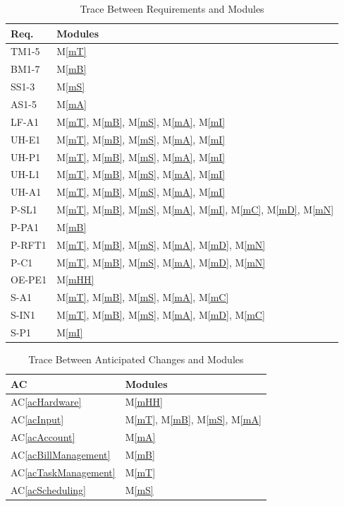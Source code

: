 \documentclass[12pt, titlepage]{article}
\newcommand{\acref}[1]{AC\ref{#1}}
\newcommand{\mref}[1]{M\ref{#1}}
\begin{document}
\begin{table}[H]
\centering
\begin{tabular}{p{} p{}}
\toprule
\textbf{Req.} & \textbf{Modules}\\
\midrule
TM1-5 & \mref{mT}\\
BM1-7 & \mref{mB}\\
SS1-3 & \mref{mS}\\
AS1-5 & \mref{mA}\\
LF-A1 & \mref{mT}, \mref{mB}, \mref{mS}, \mref{mA}, \mref{mI}\\
UH-E1 & \mref{mT}, \mref{mB}, \mref{mS}, \mref{mA}, \mref{mI}\\
UH-P1 & \mref{mT}, \mref{mB}, \mref{mS}, \mref{mA}, \mref{mI}\\
UH-L1 & \mref{mT}, \mref{mB}, \mref{mS}, \mref{mA}, \mref{mI}\\
UH-A1 & \mref{mT}, \mref{mB}, \mref{mS}, \mref{mA}, \mref{mI}\\
P-SL1 & \mref{mT}, \mref{mB}, \mref{mS}, \mref{mA}, \mref{mI}, \mref{mC}, \mref{mD}, \mref{mN}\\
P-PA1 & \mref{mB}\\
P-RFT1 & \mref{mT}, \mref{mB}, \mref{mS}, \mref{mA}, \mref{mD}, \mref{mN}\\
P-C1 & \mref{mT}, \mref{mB}, \mref{mS}, \mref{mA}, \mref{mD}, \mref{mN}\\
OE-PE1 & \mref{mHH}\\
S-A1 & \mref{mT}, \mref{mB}, \mref{mS}, \mref{mA}, \mref{mC}\\
S-IN1 & \mref{mT}, \mref{mB}, \mref{mS}, \mref{mA}, \mref{mD}, \mref{mC}\\
S-P1 & \mref{mI}\\
\bottomrule
\end{tabular}
\caption{Trace Between Requirements and Modules}
\label{TblRT}
\end{table}

\begin{table}[H]
\centering
\begin{tabular}{p{} p{}}
\toprule
\textbf{AC} & \textbf{Modules}\\
\midrule
\acref{acHardware} & \mref{mHH}\\
\acref{acInput} & \mref{mT}, \mref{mB}, \mref{mS}, \mref{mA}\\
\acref{acAccount} & \mref{mA}\\
\acref{acBillManagement} & \mref{mB}\\
\acref{acTaskManagement} & \mref{mT}\\
\acref{acScheduling} & \mref{mS}\\
\bottomrule
\end{tabular}
\caption{Trace Between Anticipated Changes and Modules}
\label{TblACT}
\end{table}
\end{document}
